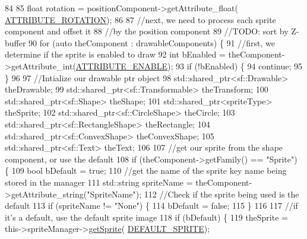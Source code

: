 \begin{DoxyCode}
84 
85         \textcolor{keywordtype}{float} rotation = positionComponent->getAttribute\_float(
      \hyperlink{_a_e___attributes_8h_a70254d936ce8b3662e1a7472c36832d5}{ATTRIBUTE\_ROTATION});
86 
87         \textcolor{comment}{//next, we need to process each sprite component and offset it}
88         \textcolor{comment}{//by the position component}
89         \textcolor{comment}{//TODO: sort by Z-buffer}
90         \textcolor{keywordflow}{for} (\textcolor{keyword}{auto} theComponent : drawableComponents) \{
91             \textcolor{comment}{//first, we determine if the sprite is enabled to draw}
92             \textcolor{keywordtype}{int} bEnabled = theComponent->getAttribute\_int(\hyperlink{_a_e___attributes_8h_a4c775095baf8a9c99621ad9ad3b622db}{ATTRIBUTE\_ENABLE});
93             \textcolor{keywordflow}{if} (!bEnabled) \{
94                 \textcolor{keywordflow}{continue};
95             \}
96 
97             \textcolor{comment}{//Intialize our drawable ptr object}
98             std::shared\_ptr<sf::Drawable> theDrawable;
99             std::shared\_ptr<sf::Transformable> theTransform;
100             std::shared\_ptr<sf::Shape> theShape;
101             std::shared\_ptr<spriteType> theSprite;
102             std::shared\_ptr<sf::CircleShape> theCircle;
103             std::shared\_ptr<sf::RectangleShape> theRectangle;
104             std::shared\_ptr<sf::ConvexShape> theConvexShape;
105             std::shared\_ptr<sf::Text> theText;
106 
107             \textcolor{comment}{//get our sprite from the shape component, or use the default}
108             \textcolor{keywordflow}{if} (theComponent->getFamily() == \textcolor{stringliteral}{"Sprite"}) \{
109                 \textcolor{keywordtype}{bool} bDefault = \textcolor{keyword}{true};
110                 \textcolor{comment}{//get the name of the sprite key name being stored in the manager}
111                 std::string spriteName = theComponent->getAttribute\_string(\textcolor{stringliteral}{"SpriteName"});
112                 \textcolor{comment}{//Check if the sprite being used is the default}
113                 \textcolor{keywordflow}{if} (spriteName != \textcolor{stringliteral}{"None"}) \{
114                     bDefault = \textcolor{keyword}{false};
115                 \}
116 
117                 \textcolor{comment}{//if it's a default, use the default sprite image}
118                 \textcolor{keywordflow}{if} (bDefault) \{
119                     theSprite = this->spriteManager->\hyperlink{class_sprite_manager_a8473bca1fad87ad11cb2249eb810889e}{getSprite}(
      \hyperlink{_sprite_manager_8h_a68f8f7c1ee25829a75d9c4f6a092ff8f}{DEFAULT\_SPRITE});

\end{DoxyCode}
